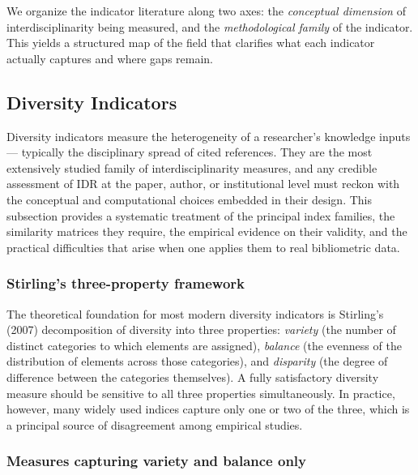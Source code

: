 \documentclass[
]{article}
\begin{document}
We organize the indicator literature along two axes: the
\emph{conceptual dimension} of interdisciplinarity being measured, and
the \emph{methodological family} of the indicator. This yields a
structured map of the field that clarifies what each indicator actually
captures and where gaps remain.

\hypertarget{diversity-indicators}{%
\subsection{Diversity Indicators}\label{diversity-indicators}}

Diversity indicators measure the heterogeneity of a researcher's
knowledge inputs --- typically the disciplinary spread of cited
references. They are the most extensively studied family of
interdisciplinarity measures, and any credible assessment of IDR at the
paper, author, or institutional level must reckon with the conceptual
and computational choices embedded in their design. This subsection
provides a systematic treatment of the principal index families, the
similarity matrices they require, the empirical evidence on their
validity, and the practical difficulties that arise when one applies
them to real bibliometric data.

\hypertarget{stirlings-three-property-framework}{%
\subsubsection{Stirling's three-property
framework}\label{stirlings-three-property-framework}}

The theoretical foundation for most modern diversity indicators is
Stirling's (2007) decomposition of diversity into three properties:
\emph{variety} (the number of distinct categories to which elements are
assigned), \emph{balance} (the evenness of the distribution of elements
across those categories), and \emph{disparity} (the degree of difference
between the categories themselves). A fully satisfactory diversity
measure should be sensitive to all three properties simultaneously. In
practice, however, many widely used indices capture only one or two of
the three, which is a principal source of disagreement among empirical
studies.

\hypertarget{measures-capturing-variety-and-balance-only}{%
\subsubsection{Measures capturing variety and balance
only}\label{measures-capturing-variety-and-balance-only}}
\end{document}
